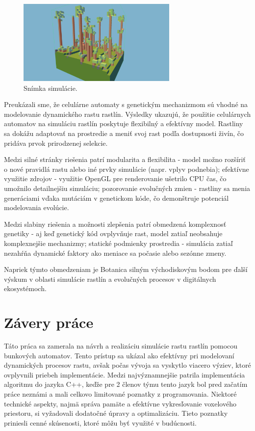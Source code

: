 \documentclass[12pt]{article}
\begin{document}
\begin{figure}[ht]
	\centering
	\includegraphics[width=0.7\textwidth]{res/screenshot.png}
	\caption{Snímka simulácie.}
\end{figure}

Preukázali sme, že celulárne
automaty s genetickým mechanizmom sú vhodné na modelovanie dynamického rastu
rastlín. Výsledky ukazujú, že použitie celulárnych automatov na simuláciu
rastlín poskytuje flexibilný a efektívny model. Rastliny sa dokážu adaptovať
na prostredie a meniť svoj rast podľa dostupnosti živín, čo pridáva prvok
prirodzenej selekcie.

Medzi silné stránky riešenia patrí modularita a
flexibilita - model možno rozšíriť o nové pravidlá rastu alebo iné prvky
simulácie (napr. vplyv podnebia); efektívne využitie zdrojov - využitie OpenGL
pre renderovanie ušetrilo CPU čas, čo umožnilo detailnejšiu simuláciu;
pozorovanie evolučných zmien - rastliny sa menia generáciami vďaka mutáciám
v genetickom kóde, čo demonštruje potenciál modelovania evolúcie.

Medzi slabiny riešenia a možnosti zlepšenia patrí obmedzená komplexnosť
genetiky - aj keď genetický kód ovplyvňuje rast, model zatiaľ neobsahuje
komplexnejšie mechanizmy; statické podmienky prostredia - simulácia zatiaľ
nezahŕňa dynamické faktory ako meniace sa počasie alebo sezónne zmeny.

Napriek týmto obmedzeniam je Botanica silným východiskovým bodom pre ďalší
výskum v oblasti simulácie rastlín a evolučných procesov v digitálnych
ekosystémoch.

\section{Závery práce}

Táto práca sa zamerala na návrh a realizáciu simulácie rastu rastlín pomocou
bunkových automatov. Tento prístup sa ukázal ako efektívny pri modelovaní
dynamických procesov rastu, avšak počas vývoja sa vyskytlo viacero výziev,
ktoré ovplyvnili priebeh implementácie. Medzi najvýznamnejšie patrila
implementácia algoritmu do jazyka C++, keďže pre 2 členov týmu tento jazyk
bol pred začatím práce neznámi a mali celkovo limitované poznatky
z programovania. Niektoré technické aspekty, najmä správa pamäte a efektívne
vykresľovanie voxelového priestoru, si vyžadovali dodatočné úpravy
a optimalizáciu. Tieto poznatky priniesli cenné skúsenosti, ktoré môžu byť
využité v budúcnosti.
\end{document}
